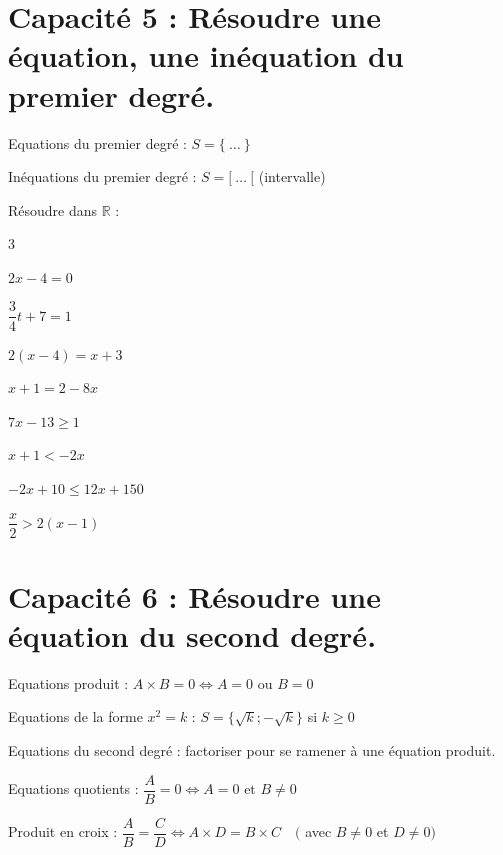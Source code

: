 \documentclass[10pt,a4paper]{article}  %
\begin{document}
\section*{Capacité 5 : Résoudre une équation, une inéquation du premier degré.}
\begin{brappel}
	\begin{itemMet}
		\item Equations du premier degré : $S=\{\ \ldots\ \}$
		\item Inéquations du premier degré : $S=[\ \ldots\ [$ (intervalle)
	\end{itemMet}
\end{brappel}
\vspace*{-0.8cm}
\exerciceDS{}
Résoudre dans $\mathbb{R}$ :
\begin{multicols}{3}
	\begin{enumMet}
		\item $2 x-4=0$
		\item $\dfrac{3}{4} t+7=1$
		\item $2(x-4)=x+3$
		\item $x+1=2-8 x$
		\item $7 x-13 \geqslant 1$
		\item $x+1<-2 x$
		\item $-2 x+10 \leqslant 12 x+150$
		\item $\dfrac{x}{2}>2(x-1)$
	\end{enumMet}
\end{multicols}
\vspace*{-0.6cm}
\section*{Capacité 6 : Résoudre une équation du second degré.}
\begin{brappel}
	\begin{itemMet}
		\item Equations produit : $A \times B=0 \Leftrightarrow A=0 \text { ou } B=0$
		\item Equations de la forme $x^{2}=k$ : $S=\{\sqrt{k};-\sqrt{k}\}$ si $k\geqslant0$
		\item Equations du second degré : factoriser pour se ramener à une équation produit.
		\item Equations quotients : $\dfrac{A}{B}=0 \Leftrightarrow A=0 \text { et } B \neq 0$
		\item Produit en croix : $\dfrac{A}{B}=\dfrac{C}{D} \Leftrightarrow A \times D=B \times C \quad($ avec $B \neq 0$ et $D \neq 0)$
	\end{itemMet}
\end{brappel}
\end{document}

